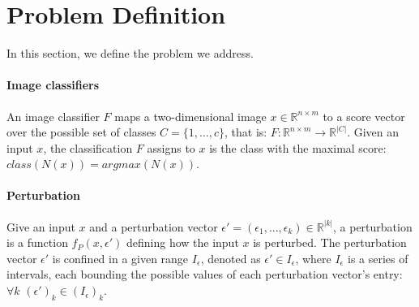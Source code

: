 \documentclass[11pt]{article}
\begin{document}
\section{Problem Definition}
In this section, we define the problem we address.

\paragraph{Image classifiers}
An image classifier $F$ maps a two-dimensional image $x\in \mathbb{R}^{n \times m}$ to a score vector over the possible set of classes $C=\{1,\ldots,c\}$, that is:
$F: \mathbb{R}^{n \times m} \rightarrow {\mathbb{R}}^{|C|}$.
Given an input $x$, the classification $F$ assigns to $x$ is the class with the maximal score: $class(N(x))=argmax(N(x))$.

\paragraph{Perturbation}
Give an input $x$ and a perturbation vector $\epsilon'=(\epsilon_1,...,\epsilon_k)\in{\mathbb{R}}^{|k|}$, a perturbation is a function $f_P(x,\epsilon')$ defining how the input $x$ is perturbed. The perturbation vector $\epsilon'$ is confined in a given range $I_\epsilon$, denoted as $\epsilon'\in I_\epsilon$, where $I_\epsilon$ is a series of intervals, each bounding the possible values of each perturbation vector's entry: $\forall{k}$ $(\epsilon')_k\in (I_\epsilon)_k$.
\end{document}
